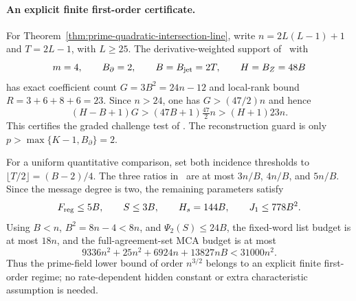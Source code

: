 \paragraph{An explicit finite first-order certificate.}
For Theorem~\ref{thm:prime-quadratic-intersection-line}, write
$n=2L(L-1)+1$ and $T=2L-1$, with $L\ge25$.
The derivative-weighted support of~\cite[Eq.~(60)]{dkt2026} with
\[
 m=4,\qquad B_\partial=2,\qquad B=B_{\rm jet}=2T,
 \qquad H=B_Z=48B
\]
has exact coefficient count $G=3B^2=24n-12$ and local-rank bound
$R=3+6+8+6=23$. Since $n>24$, one has $G>(47/2)n$ and hence
\[
 (H-B+1)G>(47B+1)\tfrac{47}{2}n>(H+1)23n.
\]
This certifies the graded challenge test of
\cite[Proposition~5.10]{dkt2026}. The reconstruction guard is only
$p>\max\{K-1,B_\partial\}=2$.

For a uniform quantitative comparison, set both incidence thresholds
to $\lfloor T/2\rfloor=(B-2)/4$.
The three ratios in~\cite[Lemma~5.6]{dkt2026} are at most
$3n/B$, $4n/B$, and $5n/B$. Since the message degree is two,
the remaining parameters satisfy
\[
 F_{\rm reg}\le5B,\qquad S\le3B,\qquad
 H_s=144B,\qquad J_1\le778B^2.
\]
Using $B<n$, $B^2=8n-4<8n$, and $\Psi_2(S)\le24B$, the fixed-word
list budget is at most $18n$, and the full-agreement-set MCA budget is
at most
\[
 9336n^2+25n^2+6924n+13827nB<31000n^2.
\]
Thus the prime-field lower bound of order $n^{3/2}$ belongs to an
explicit finite first-order regime; no rate-dependent hidden constant
or extra characteristic assumption is needed.
